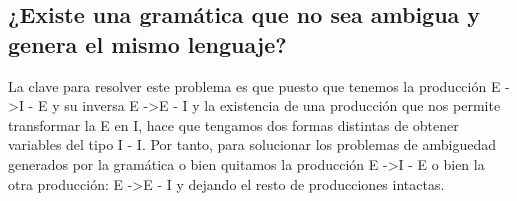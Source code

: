\subsection{¿Existe una gramática que no sea ambigua y genera el mismo lenguaje?}
La clave para resolver este problema es que puesto que tenemos la producción E ->\space I - E y su inversa E ->\space E - I y la existencia de una producción que nos permite transformar la E en I, hace que tengamos dos formas distintas de obtener variables del tipo I - I. Por tanto, para solucionar los problemas de ambiguedad generados por la gramática o bien quitamos la producción E ->\space I - E o bien la otra producción: E ->\space E - I y dejando el resto de producciones intactas.


